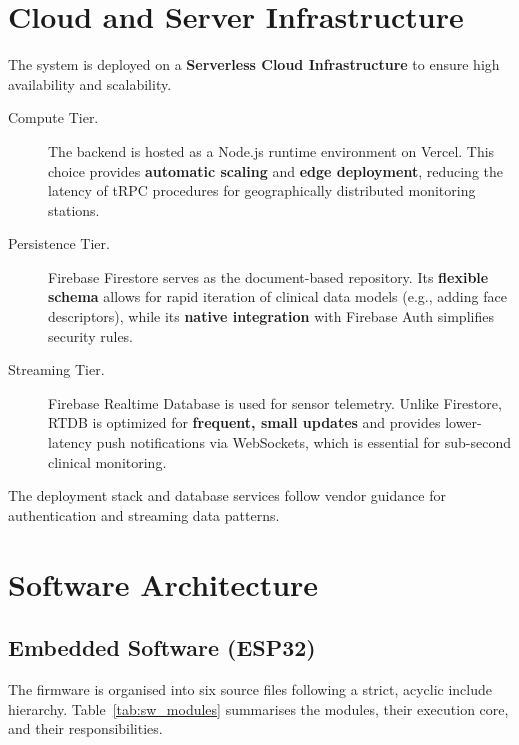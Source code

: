 \section{Cloud and Server Infrastructure}
The system is deployed on a \textbf{Serverless Cloud Infrastructure} to ensure high availability and scalability.
\begin{description}
	\item[Compute Tier.] The backend is hosted as a Node.js runtime environment on Vercel. This choice provides \textbf{automatic scaling} and \textbf{edge deployment}, reducing the latency of tRPC procedures for geographically distributed monitoring stations.
	\item[Persistence Tier.] Firebase Firestore serves as the document-based repository. Its \textbf{flexible schema} allows for rapid iteration of clinical data models (e.g., adding face descriptors), while its \textbf{native integration} with Firebase Auth simplifies security rules.
	\item[Streaming Tier.] Firebase Realtime Database is used for sensor telemetry. Unlike Firestore, RTDB is optimized for \textbf{frequent, small updates} and provides lower-latency push notifications via WebSockets, which is essential for sub-second clinical monitoring.
\end{description}
The deployment stack and database services follow vendor guidance for authentication and streaming data patterns.\cite{vercel,firebase_firestore,firebase_rtdb,firebase_auth}

\section{Software Architecture}

\subsection*{Embedded Software (ESP32)}

The firmware is organised into six source files following a strict, acyclic include
hierarchy.
Table~\ref{tab:sw_modules} summarises the modules, their execution core, and their
responsibilities.

